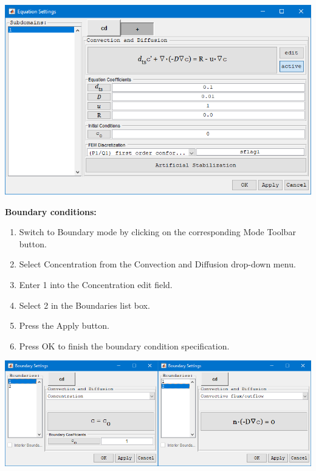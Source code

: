 \documentclass{article}
\begin{document}
\begin{center}
\includegraphics[scale=0.60]{./matlab/FEATool_steps/PDEparametersAndInitialCondition.png}
\end{center}

\textbf{Boundary conditions:}
\begin{enumerate}[resume]
\item Switch to Boundary mode by clicking on the corresponding Mode Toolbar button.
\item Select Concentration from the Convection and Diffusion drop-down menu.
\item Enter  1  into the Concentration edit field.
\item Select 2 in the Boundaries list box.
\item Press the Apply button.
\item Press OK to finish the boundary condition specification.
\end{enumerate}

\begin{center}
\includegraphics[scale=0.60]{./matlab/FEATool_steps/boundaryConditions.png}
\end{center}
\end{document}
